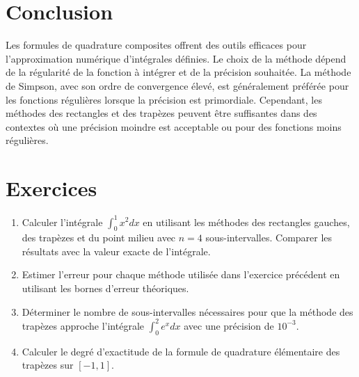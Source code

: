 \documentclass{article}
\begin{document}
\section{Conclusion}

Les formules de quadrature composites offrent des outils efficaces pour l'approximation numérique d'intégrales définies. Le choix de la méthode dépend de la régularité de la fonction à intégrer et de la précision souhaitée. La méthode de Simpson, avec son ordre de convergence élevé, est généralement préférée pour les fonctions régulières lorsque la précision est primordiale. Cependant, les méthodes des rectangles et des trapèzes peuvent être suffisantes dans des contextes où une précision moindre est acceptable ou pour des fonctions moins régulières.

\section{Exercices}

\begin{enumerate}
    \item Calculer l'intégrale $\int_{0}^{1} x^2 dx$ en utilisant les méthodes des rectangles gauches, des trapèzes et du point milieu avec $n=4$ sous-intervalles. Comparer les résultats avec la valeur exacte de l'intégrale.
    \item Estimer l'erreur pour chaque méthode utilisée dans l'exercice précédent en utilisant les bornes d'erreur théoriques.
    \item Déterminer le nombre de sous-intervalles nécessaires pour que la méthode des trapèzes approche l'intégrale $\int_{0}^{2} e^x dx$ avec une précision de $10^{-3}$.
    \item Calculer le degré d'exactitude de la formule de quadrature élémentaire des trapèzes sur $[-1, 1]$.
\end{enumerate}
\end{document}
